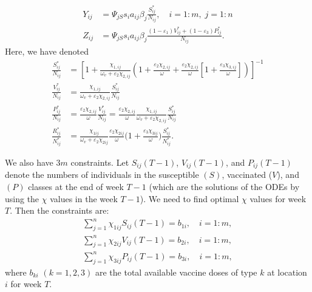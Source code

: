 \documentclass[12pt]{amsart}
\theoremstyle{definition}
\begin{document}
\begin{equation}\label{yz-ij-def}
\begin{aligned}
Y_{ij} &= \Psi_{jS}s_ia_{ij}\beta_j \frac{S_{ij}^*}{N_{ij}}, \quad i=1:m,\; j=1:n\\
Z_{ij} &= \Psi_{jS} s_i a_{ij}\beta_j \frac{(1-\varepsilon_{1})V_{ij}^*+(1-\varepsilon_{3})P_{ij}^*}{N_{ij}}.
\end{aligned}
\end{equation}
Here, we have denoted
\begin{equation}\label{si-def}
\begin{aligned}
\frac{S_{ij}^*}{N_{ij}}&= \left\lbrack
1+\frac{\chi_{1,ij}}{\omega_v+\varepsilon_2\chi_{2,ij}}
\left(1+\frac{\varepsilon_{2}\chi_{2,ij}}{\omega}+
\frac{\varepsilon_{2}\chi_{2,ij}}{\omega}\left\lbrack
1+\frac{\varepsilon_{3}\chi_{3,ij}}{\omega}
\right\rbrack
\right)
\right\rbrack^{-1}\\
\frac{V_{ij}^*}{N_{ij}}&=  \frac{\chi_{1,ij}}{\omega_{v}+\varepsilon_2\chi_{2,ij}} \frac{S_{ij}^*}{N_{ij}}\\
\frac{P_{ij}^*}{N_{ij}}&= \frac{\varepsilon_{2}\chi_{2,ij}}{\omega}\frac{V_{ij}^*}{N_{ij}}=
\frac{\varepsilon_{2}\chi_{2,ij}}{\omega}
\frac{\chi_{1,ij}}{\omega_{v}+\varepsilon_2\chi_{2,ij}} \frac{S_{ij}^*}{N_{ij}} \\
 \frac{R_{ij}^*}{N^*_{ij}}&=
\frac{\chi_{1ij}}{\omega_v+\varepsilon_2 \chi_{2ij}}
\frac{\varepsilon_2 \chi_{2ij}}{\omega}
\Big(1+\frac{\varepsilon_3 \chi_{3ij}}{\omega}\Big)
\frac{S_{ij}^*}{N^*_{ij}}.
\end{aligned}
\end{equation}

We also have $3m$ constraints. Let $S_{ij}(T-1)$, $V_{ij}(T-1)$, and 
$P_{ij}(T-1)$ denote the numbers of individuals in the susceptible $(S)$, vaccinated ($V$), and $(P)$ classes {\color{red} at the end of week $T-1$} (which are the solutions of the ODEs by using the $\chi$ values in the week $T-1$). We need to find optimal $\chi$ values for week $T$. Then the constraints are:
\begin{equation}\label{eq:c}
\begin{array}{l}
\sum_{j=1}^n \chi_{1ij} S_{ij}(T-1) = b_{1i}, \quad i=1:m, \\
\sum_{j=1}^n \chi_{2ij} V_{ij}(T-1) = b_{2i}, \quad i=1:m, \\
\sum_{j=1}^n \chi_{3ij} P_{ij}(T-1) = b_{3i}, \quad i=1:m, 
\end{array}
\end{equation}
where $b_{ki}$ $(k=1, 2, 3)$ are the total available vaccine doses of type $k$ at location $i$ for week $T$. 
\end{document}
